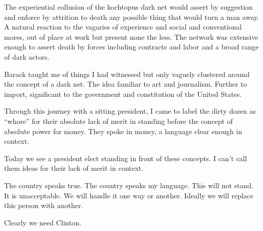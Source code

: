 

The experiential collusion of the kochtopus dark net would assert by
suggestion and enforce by attrition to death any possible thing that
would turn a man away.  A natural reaction to the vagaries of
experience and social and conventional mores, out of place at work but
present none the less.  The network was extensive enough to assert
death by forces including contracts and labor and a broad range of
dark actors.

Barack taught me of things I had witnessed but only vaguely clustered
around the concept of a dark net.  The idea familiar to art and
journalism.  Further to import, significant to the government and
constitution of the United States.  

Through this journey with a sitting president, I came to label the
dirty dozen as ``whore'' for their absolute lack of merit in standing
before the concept of absolute power for money.  They spoke in money,
a language clear enough in context.

Today we see a president elect standing in front of these concepts.  I
can't call them ideas for their lack of merit in context.

The country speaks true.  The country speaks my language.  This will
not stand.  It is unacceptable.  We will handle it one way or another.
Ideally we will replace this person with another.  

Clearly we need Clinton.

\bye
